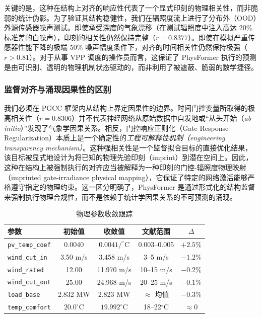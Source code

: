 关键的是，这种在结构上对齐的响应性代表了一个显式印刻的物理相关性，而非脆弱的统计伪影。为了验证其结构稳健性，我们在辐照度流上进行了分布外（OOD）外源传感器噪声测试。即使承受深度的气象漂移（在测试辐照度中注入高达 20\% 标准差的白噪声），印刻的相关性仍然保持完整（$r = 0.8377$）。即使在模拟严重传感器性能下降的极端 50\% 噪声幅度条件下，对齐的时间相关性仍然保持极强（$r > 0.81$）。对于从事 VPP 调度的操作员而言，这保证了 PhysFormer 执行的预测是由可识别、透明的物理机制状态驱动的，而非利用了被遮蔽、脆弱的数学捷径。

\subsubsection{监督对齐与涌现因果性的区别}
我们必须在 PGCC 框架内从结构上界定因果性的边界。时间门控变量所取得的极高相关性（$r=0.8306$）并不代表神经网络从原始数据中自发地或“从头开始（\textit{ab initio}）”发现了气象学因果关系。相反，门控响应正则化（Gate Response Regularization）本质上是一个确定性的\textit{工程可解释性机制（engineering transparency mechanism）}。这种强相关性是一个监督拟合目标的直接优化结果，该目标被显式地设计为将已知的物理先验印刻（imprint）到潜在空间上。因此，这种在结构上被强制执行的对齐应当被解释为一种印刻的门控-辐照度物理映射（imprinted gate-irradiance physical mapping），它保证了特定的网络激活能够严格遵守指定的物理约束。这一区分明确了，PhysFormer 是通过形式化的结构监督来强制执行物理合规性，而不是依赖于统计学因果关系的不可预测的涌现。

\begin{table}[htbp]
\centering
\caption{物理参数收敛跟踪}
\label{tab:physical_params}
\footnotesize
\setlength{\tabcolsep}{3pt}
\begin{tabular*}{\columnwidth}{@{\extracolsep{\fill}}lcccc@{}}
\toprule
参数 & 初始值 & 收敛值 & 文献范围 & $\Delta$ \\
\midrule
\texttt{pv\_temp\_coef} & 0.0040 & $0.0041/^\circ$C & 0.003--0.005 & $+2.5\%$ \\
\texttt{wind\_cut\_in} & 3.50 m/s & 3.458 m/s & 3--5 m/s & $-1.2\%$ \\
\texttt{wind\_rated} & 12.00 & 11.970 m/s & 10--15 m/s & $-0.2\%$ \\
\texttt{wind\_cut\_out} & 25.00 & 24.968 m/s & 20--25 m/s & $-0.1\%$ \\
\texttt{load\_base} & 2.832 MW & 2.823 MW & $\approx$ 均值 & $-0.3\%$ \\
\texttt{temp\_comfort} & $20.0^\circ$C & $19.992^\circ$C & 18--22$^\circ$C & $\approx 0$ \\
\bottomrule
\end{tabular*}
\end{table}

